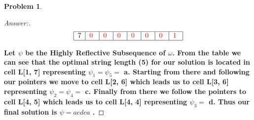 \documentclass[11pt]{article}
\theoremstyle{definition}
\theoremstyle{definition}
\newtheorem{required}{Problem}
\theoremstyle{definition}
\begin{document}
\begin{required}
\begin{enumerate}[label=(\alph*)]
\begin{proof}[Answer:]
\begin{align*}
\begin{tabular}{|c|c|c|c|c|c|c|c|}
\hline
\textbf{$7$} & \color{red} 0 \color{black} & \color{red} 0 \color{black} & \color{red} 0 \color{black} & \color{red} 0 \color{black} & \color{red} 0 \color{black} & \color{red} 0 \color{black} & \color{red} 1 \color{black} \\
\hline
\end{tabular}
\end{align*}
\item \textbf{Let $\psi$ be the Highly Reflective Subsequence of $\omega$. From the table we can see that the optimal string length \color{red} (5) \color{black} for our solution is located in cell L[1, 7] representing $\psi_1 = \psi_5 =$ a. Starting from there and following our pointers we move to cell L[2, 6] which leads us to cell L[3, 6] representing $\psi_2 = \psi_4 =$ c. Finally from there we follow the pointers to cell L[4, 5] which leads us to cell L[4, 4] representing $\psi_3 =$ d. Thus our final solution is \color{red} $\psi = acdca$ \color{black}.}
\end{proof}

\end{enumerate}



\end{required}
\end{document}
